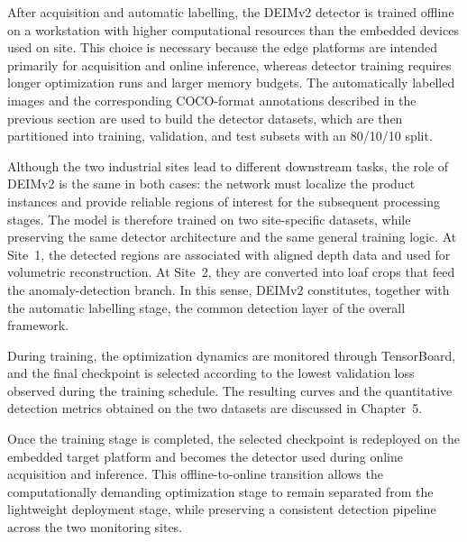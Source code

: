 
After acquisition and automatic labelling, the DEIMv2 detector is trained offline on a workstation with higher computational resources than the embedded devices used on site.\cite{huang_real-time_2026} This choice is necessary because the edge platforms are intended primarily for acquisition and online inference, whereas detector training requires longer optimization runs and larger memory budgets.
The automatically labelled images and the corresponding COCO-format annotations described in the previous section are used to build the detector datasets, which are then partitioned into training, validation, and test subsets with an 80/10/10 split.

Although the two industrial sites lead to different downstream tasks, the role of DEIMv2 is the same in both cases: the network must localize the product instances and provide reliable regions of interest for the subsequent processing stages. The model is therefore trained on two site-specific datasets, while preserving the same detector architecture and the same general training logic.\cite{labby_thesis_repo_2026} At Site~1, the detected regions are associated with aligned depth data and used for volumetric reconstruction. At Site~2, they are converted into loaf crops that feed the anomaly-detection branch. In this sense, DEIMv2 constitutes, together with the automatic labelling stage, the common detection layer of the overall framework.

During training, the optimization dynamics are monitored through TensorBoard, and the final checkpoint is selected according to the lowest validation loss observed during the training schedule. The resulting curves and the quantitative detection metrics obtained on the two datasets are discussed in Chapter~5.

Once the training stage is completed, the selected checkpoint is redeployed on the embedded target platform and becomes the detector used during online acquisition and inference. This offline-to-online transition allows the computationally demanding optimization stage to remain separated from the lightweight deployment stage, while preserving a consistent detection pipeline across the two monitoring sites.\cite{labby_thesis_repo_2026}
